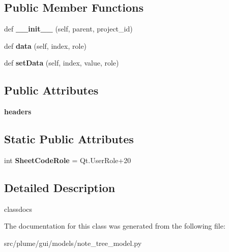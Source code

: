 \subsection*{Public Member Functions}
\begin{DoxyCompactItemize}
\item 
def {\bfseries \+\_\+\+\_\+init\+\_\+\+\_\+} (self, parent, project\+\_\+id)\hypertarget{classplume-creator_1_1src_1_1plume_1_1gui_1_1models_1_1note__tree__model_1_1_note_tree_model_a42f28e13e70be9dc41e65e2db51d83da}{}\label{classplume-creator_1_1src_1_1plume_1_1gui_1_1models_1_1note__tree__model_1_1_note_tree_model_a42f28e13e70be9dc41e65e2db51d83da}

\item 
def {\bfseries data} (self, index, role)\hypertarget{classplume-creator_1_1src_1_1plume_1_1gui_1_1models_1_1note__tree__model_1_1_note_tree_model_af732e7da7c5dcf8e089fa69103ba0428}{}\label{classplume-creator_1_1src_1_1plume_1_1gui_1_1models_1_1note__tree__model_1_1_note_tree_model_af732e7da7c5dcf8e089fa69103ba0428}

\item 
def {\bfseries set\+Data} (self, index, value, role)\hypertarget{classplume-creator_1_1src_1_1plume_1_1gui_1_1models_1_1note__tree__model_1_1_note_tree_model_a46615285cb1b9f6356dbe00e66560166}{}\label{classplume-creator_1_1src_1_1plume_1_1gui_1_1models_1_1note__tree__model_1_1_note_tree_model_a46615285cb1b9f6356dbe00e66560166}

\end{DoxyCompactItemize}
\subsection*{Public Attributes}
\begin{DoxyCompactItemize}
\item 
{\bfseries headers}\hypertarget{classplume-creator_1_1src_1_1plume_1_1gui_1_1models_1_1note__tree__model_1_1_note_tree_model_a677153f02a7e82cf0376bde3b878f7c6}{}\label{classplume-creator_1_1src_1_1plume_1_1gui_1_1models_1_1note__tree__model_1_1_note_tree_model_a677153f02a7e82cf0376bde3b878f7c6}

\end{DoxyCompactItemize}
\subsection*{Static Public Attributes}
\begin{DoxyCompactItemize}
\item 
int {\bfseries Sheet\+Code\+Role} = Qt.\+User\+Role+20\hypertarget{classplume-creator_1_1src_1_1plume_1_1gui_1_1models_1_1note__tree__model_1_1_note_tree_model_a364e9cb49583f27075ab94868db4e333}{}\label{classplume-creator_1_1src_1_1plume_1_1gui_1_1models_1_1note__tree__model_1_1_note_tree_model_a364e9cb49583f27075ab94868db4e333}

\end{DoxyCompactItemize}


\subsection{Detailed Description}
classdocs 

The documentation for this class was generated from the following file\+:\begin{DoxyCompactItemize}
\item 
src/plume/gui/models/note\+\_\+tree\+\_\+model.\+py\end{DoxyCompactItemize}
